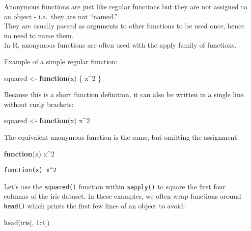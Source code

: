 \documentclass[
]{book}
\newenvironment{Shaded}{\begin{snugshade}}{\end{snugshade}}
\newcommand{\ControlFlowTok}[1]{\textcolor[rgb]{0.13,0.29,0.53}{\textbf{#1}}}
\newcommand{\DecValTok}[1]{\textcolor[rgb]{0.00,0.00,0.81}{#1}}
\newcommand{\FunctionTok}[1]{\textcolor[rgb]{0.00,0.00,0.00}{#1}}
\newcommand{\NormalTok}[1]{#1}
\newcommand{\OtherTok}[1]{\textcolor[rgb]{0.56,0.35,0.01}{#1}}
\newcommand{\SpecialCharTok}[1]{\textcolor[rgb]{0.00,0.00,0.00}{#1}}
\begin{document}
Anonymous functions are just like regular functions but they are not assigned to an object - i.e.~they are not ``named.''\\
They are usually passed as arguments to other functions to be used once, hence no need to name them.\\
In R, anonymous functions are often used with the apply family of functions.

Example of a simple regular function:

\begin{Shaded}
\begin{Highlighting}[]
\NormalTok{squared }\OtherTok{\textless{}{-}} \ControlFlowTok{function}\NormalTok{(x) \{}
\NormalTok{  x}\SpecialCharTok{\^{}}\DecValTok{2}
\NormalTok{\}}
\end{Highlighting}
\end{Shaded}

Because this is a short function definition, it can also be written in a single line without curly brackets:

\begin{Shaded}
\begin{Highlighting}[]
\NormalTok{squared }\OtherTok{\textless{}{-}} \ControlFlowTok{function}\NormalTok{(x) x}\SpecialCharTok{\^{}}\DecValTok{2}
\end{Highlighting}
\end{Shaded}

The equivalent anonymous function is the same, but omitting the assignment:

\begin{Shaded}
\begin{Highlighting}[]
\ControlFlowTok{function}\NormalTok{(x) x}\SpecialCharTok{\^{}}\DecValTok{2}
\end{Highlighting}
\end{Shaded}

\begin{verbatim}
function(x) x^2
\end{verbatim}

Let's use the \texttt{squared()} function within \texttt{sapply()} to square the first four columns of the iris dataset. In these examples, we often wrap functions around \texttt{head()} which prints the first few lines of an object to avoid:

\begin{Shaded}
\begin{Highlighting}[]
\FunctionTok{head}\NormalTok{(iris[, }\DecValTok{1}\SpecialCharTok{:}\DecValTok{4}\NormalTok{])}
\end{Highlighting}
\end{Shaded}
\end{document}
